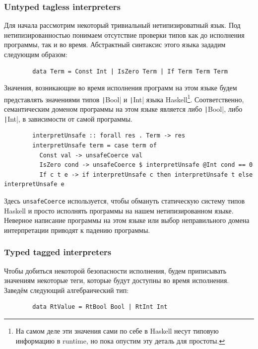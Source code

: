 \documentclass[12pt]{article}
\begin{document}
    \subsubsection{Untyped tagless interpreters}

    Для начала рассмотрим некоторый тривиальный нетипизироватный язык.
    Под нетипизированностью понимаем отсутствие проверки типов как до исполнения программы, так и во время.
    Абстрактный синтаксис этого языка зададим следующим образом:
    \begin{verbatim}
        data Term = Const Int | IsZero Term | If Term Term Term
    \end{verbatim}

    Значения, возникающие во время исполнения программ на этом языке будем представлять значениями типов \texttt|Bool| и \texttt|Int| языка Haskell\footnote{На самом деле эти значения сами по себе в Haskell несут типовую информацию в runtime, но пока опустим эту деталь для простоты.}.
    Соответственно, семантическим доменом программы на этом языке является либо \texttt|Bool|, либо \texttt|Int|, в зависимости от самой программы.
    \begin{verbatim}
        interpretUnsafe :: forall res . Term -> res
        interpretUnsafe term = case term of
          Const val -> unsafeCoerce val
          IsZero cond -> unsafeCoerce $ interpretUnsafe @Int cond == 0
          If c t e -> if interpretUnsafe c then interpretUnsafe t else interpretUnsafe e
    \end{verbatim}

    Здесь \texttt{unsafeCoerce} используется, чтобы обмануть статическую систему типов Haskell и просто исполнять программы на нашем нетипизированном языке.
    Неверное написание программы на этом языке или выбор неправильного домена интерпретации приводят к падению программы.

    \subsubsection{Typed tagged interpreters}

    Чтобы добиться некоторой безопасности исполнения, будем приписывать значениям некоторые теги, которые будут доступны во время исполнения.
    Заведём следующий алгебраический тип:
    \begin{verbatim}
        data RtValue = RtBool Bool | RtInt Int
    \end{verbatim}
\end{document}
